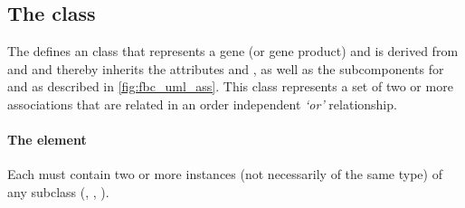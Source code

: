 
\subsection{The \FBC {} class}
\label{or-class}

The \FBCPackage defines an \GeneOr class that represents a gene (or gene product) and is derived from and \Association and thereby inherits the \SBase attributes  and , as well as the subcomponents for \Annotation and \Notes as described in \ref{fig:fbc_uml_ass}. This class represents a set of two or more associations that are related in an order independent \emph{`or'} relationship.

\paragraph{The  element}
Each \GeneOr must contain two or more instances (not necessarily of the same type) of any \Association subclass (\GeneAnd, \GeneOr, \Gene).

